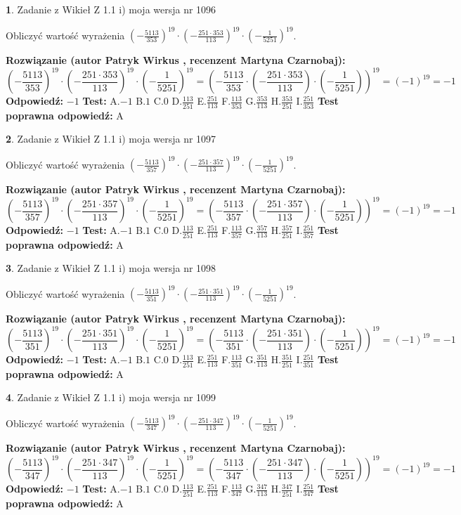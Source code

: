 \documentclass[12pt, a4paper]{article}
\theoremstyle{definition} %
\newtheorem{zad}{}
\newcommand{\zadStart}[1]{\begin{zad}#1\newline}
\newcommand{\zadStop}{\end{zad}}
\newcommand{\rozwStart}[2]{\noindent \textbf{Rozwiązanie (autor #1 , recenzent #2): }\newline}
\newcommand{\rozwStop}{\newline}
\newcommand{\odpStart}{\noindent \textbf{Odpowiedź:}\newline}
\newcommand{\odpStop}{\newline}
\newcommand{\testStart}{\noindent \textbf{Test:}\newline}
\newcommand{\testStop}{\newline}
\newcommand{\kluczStart}{\noindent \textbf{Test poprawna odpowiedź:}\newline}
\newcommand{\kluczStop}{\newline}
\begin{document}
\zadStart{Zadanie z Wikieł Z 1.1 i) moja wersja nr 1096}

Obliczyć wartość wyrażenia $(-\frac{5113}{353})^{19} \cdot (-\frac{251 \cdot 353}{113})^{19} \cdot (-\frac{1}{5251})^{19}$.
\zadStop
\rozwStart{Patryk Wirkus}{Martyna Czarnobaj}
$$(-\frac{5113}{353})^{19} \cdot (-\frac{251 \cdot 353}{113})^{19} \cdot (-\frac{1}{5251})^{19} = (-\frac{5113}{353} \cdot (-\frac{251 \cdot 353}{113}) \cdot (-\frac{1}{5251}))^{19} = (-1)^{19} = -1$$
\rozwStop
\odpStart
$-1$
\odpStop
\testStart
A.$-1$ B.$1$ C.$0$ D.$\frac{113}{251}$ E.$\frac{251}{113}$
F.$\frac{113}{353}$ G.$\frac{353}{113}$
H.$\frac{353}{251}$
I.$\frac{251}{353}$
\testStop
\kluczStart
A
\kluczStop



\zadStart{Zadanie z Wikieł Z 1.1 i) moja wersja nr 1097}

Obliczyć wartość wyrażenia $(-\frac{5113}{357})^{19} \cdot (-\frac{251 \cdot 357}{113})^{19} \cdot (-\frac{1}{5251})^{19}$.
\zadStop
\rozwStart{Patryk Wirkus}{Martyna Czarnobaj}
$$(-\frac{5113}{357})^{19} \cdot (-\frac{251 \cdot 357}{113})^{19} \cdot (-\frac{1}{5251})^{19} = (-\frac{5113}{357} \cdot (-\frac{251 \cdot 357}{113}) \cdot (-\frac{1}{5251}))^{19} = (-1)^{19} = -1$$
\rozwStop
\odpStart
$-1$
\odpStop
\testStart
A.$-1$ B.$1$ C.$0$ D.$\frac{113}{251}$ E.$\frac{251}{113}$
F.$\frac{113}{357}$ G.$\frac{357}{113}$
H.$\frac{357}{251}$
I.$\frac{251}{357}$
\testStop
\kluczStart
A
\kluczStop



\zadStart{Zadanie z Wikieł Z 1.1 i) moja wersja nr 1098}

Obliczyć wartość wyrażenia $(-\frac{5113}{351})^{19} \cdot (-\frac{251 \cdot 351}{113})^{19} \cdot (-\frac{1}{5251})^{19}$.
\zadStop
\rozwStart{Patryk Wirkus}{Martyna Czarnobaj}
$$(-\frac{5113}{351})^{19} \cdot (-\frac{251 \cdot 351}{113})^{19} \cdot (-\frac{1}{5251})^{19} = (-\frac{5113}{351} \cdot (-\frac{251 \cdot 351}{113}) \cdot (-\frac{1}{5251}))^{19} = (-1)^{19} = -1$$
\rozwStop
\odpStart
$-1$
\odpStop
\testStart
A.$-1$ B.$1$ C.$0$ D.$\frac{113}{251}$ E.$\frac{251}{113}$
F.$\frac{113}{351}$ G.$\frac{351}{113}$
H.$\frac{351}{251}$
I.$\frac{251}{351}$
\testStop
\kluczStart
A
\kluczStop



\zadStart{Zadanie z Wikieł Z 1.1 i) moja wersja nr 1099}

Obliczyć wartość wyrażenia $(-\frac{5113}{347})^{19} \cdot (-\frac{251 \cdot 347}{113})^{19} \cdot (-\frac{1}{5251})^{19}$.
\zadStop
\rozwStart{Patryk Wirkus}{Martyna Czarnobaj}
$$(-\frac{5113}{347})^{19} \cdot (-\frac{251 \cdot 347}{113})^{19} \cdot (-\frac{1}{5251})^{19} = (-\frac{5113}{347} \cdot (-\frac{251 \cdot 347}{113}) \cdot (-\frac{1}{5251}))^{19} = (-1)^{19} = -1$$
\rozwStop
\odpStart
$-1$
\odpStop
\testStart
A.$-1$ B.$1$ C.$0$ D.$\frac{113}{251}$ E.$\frac{251}{113}$
F.$\frac{113}{347}$ G.$\frac{347}{113}$
H.$\frac{347}{251}$
I.$\frac{251}{347}$
\testStop
\kluczStart
A
\kluczStop
\end{document}
